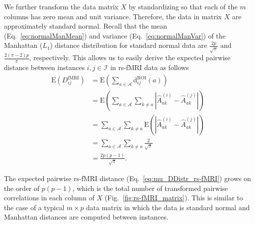 \documentclass[aos]{imsart}
\begin{document}
We further transform the data matrix $X$ by standardizing so that each of the $m$ columns has zero mean and unit variance. Therefore, the data in matrix $X$ are approximately standard normal. Recall that the mean (Eq.~\ref{eq:normalManMean}) and variance (Eq.~\ref{eq:normalManVar}) of the Manhattan ($L_1$) distance distribution for standard normal data are $\frac{2p}{\sqrt{\pi}}$ and $\frac{2(\pi - 2)p}{\pi}$, respectively. This allows us to easily derive the expected pairwise distance between instances $i,j \in \mathcal{I}$ in rs-fMRI data as follows
%
\begin{equation}\label{eq:mu_DDistr_rs-fMRI}
\begin{aligned}
\text{E}(D^\text{fMRI}_{ij}) &= \text{E}\left(\sum_{a \in \mathcal{A}} \text{d}^\text{ROI}_{ij}(a)\right) \\
&= \text{E}\left(\sum_{a \in \mathcal{A}} \sum_{k \neq a} \left|\hat{A}^{(i)}_{ak} - \hat{A}^{(j)}_{ak}\right|\right) \\
&= \sum_{a \in \mathcal{A}} \sum_{k \neq a} \text{E}\left(\left|\hat{A}^{(i)}_{ak} - \hat{A}^{(j)}_{ak}\right|\right) \\
&= \sum_{a \in \mathcal{A}} \sum_{k \neq a} \frac{2}{\sqrt{\pi}} \\
&= \frac{2p(p-1)}{\sqrt{\pi}}.
\end{aligned}
\end{equation}

The expected pairwise rs-fMRI distance (Eq.~\ref{eq:mu_DDistr_rs-fMRI}) grows on the order of $p(p-1)$, which is the total number of transformed pairwise correlations in each column of $X$ (Fig.~\ref{fig:rs-fMRI_matrix}). This is similar to the case of a typical $m \times p$ data matrix in which the data is standard normal and Manhattan distances are computed between instances. 
\end{document}
